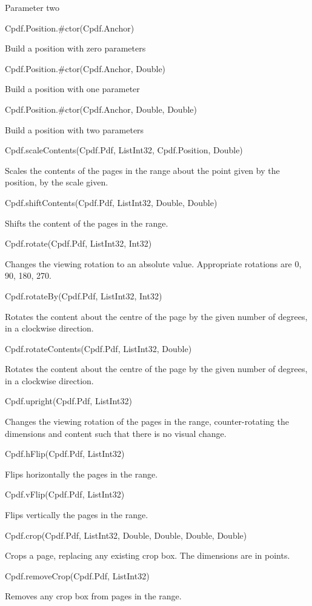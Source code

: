 Parameter two

Cpdf.Position.#ctor(Cpdf.Anchor)

Build a position with zero parameters

Cpdf.Position.#ctor(Cpdf.Anchor, Double)

Build a position with one parameter

Cpdf.Position.#ctor(Cpdf.Anchor, Double, Double)

Build a position with two parameters

Cpdf.scaleContents(Cpdf.Pdf, List{Int32}, Cpdf.Position, Double)

Scales the contents of the
pages in the range about the point given by the position, by the
scale given.

Cpdf.shiftContents(Cpdf.Pdf, List{Int32}, Double, Double)

Shifts the content of the pages in
the range.

Cpdf.rotate(Cpdf.Pdf, List{Int32}, Int32)

Changes the viewing rotation to an
absolute value. Appropriate rotations are 0, 90, 180, 270.

Cpdf.rotateBy(Cpdf.Pdf, List{Int32}, Int32)

Rotates the content about the
centre of the page by the given number of degrees, in a clockwise
direction.

Cpdf.rotateContents(Cpdf.Pdf, List{Int32}, Double)

Rotates the content about the
centre of the page by the given number of degrees, in a clockwise
direction.

Cpdf.upright(Cpdf.Pdf, List{Int32})

Changes the viewing rotation of the pages in the
range, counter-rotating the dimensions and content such that there is no
visual change.

Cpdf.hFlip(Cpdf.Pdf, List{Int32})

Flips horizontally the pages in the range.

Cpdf.vFlip(Cpdf.Pdf, List{Int32})

Flips vertically the pages in the range.

Cpdf.crop(Cpdf.Pdf, List{Int32}, Double, Double, Double, Double)

Crops a page, replacing any existing
crop box. The dimensions are in points.

Cpdf.removeCrop(Cpdf.Pdf, List{Int32})

Removes any crop box from pages in the range.


